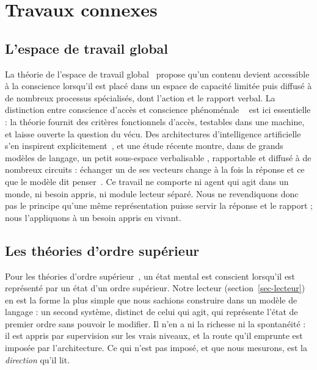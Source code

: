 \documentclass[11pt,a4paper]{article}
\begin{document}
\section{Travaux connexes}
\label{sec-related}

\subsection{L'espace de travail global}

La théorie de l'espace de travail global~\cite{baars1988,dehaene2001,dehaene2011,mashour2020}
propose qu'un contenu devient accessible à la conscience lorsqu'il est placé dans
un espace de capacité limitée puis diffusé à de nombreux processus spécialisés,
dont l'action et le rapport verbal. La distinction entre conscience \og d'accès \fg{}
et conscience \og phénoménale \fg{}~\cite{block1995} est ici essentielle : la
théorie fournit des critères fonctionnels d'accès, testables dans une machine, et
laisse ouverte la question du vécu. Des architectures d'intelligence artificielle
s'en inspirent explicitement~\cite{vanrullen2021,goyal2022}, et une étude
récente montre, dans de grands modèles de langage, un petit sous-espace
\og verbalisable \fg{}, rapportable et diffusé à de nombreux circuits : échanger
un de ses vecteurs change à la fois la réponse et ce que le modèle dit
penser~\cite{workspace2026}. Ce travail ne comporte ni agent qui agit dans un
monde, ni besoin appris, ni module lecteur séparé. Nous ne revendiquons donc pas
le principe qu'une même représentation puisse servir la réponse et le rapport ;
nous l'appliquons à un besoin appris en vivant.

\subsection{Les théories d'ordre supérieur}

Pour les théories d'ordre supérieur~\cite{rosenthal2005,lau2011,brown2019}, un état
mental est conscient lorsqu'il est représenté par un état d'un ordre supérieur.
Notre lecteur (section~\ref{sec-lecteur}) en est la forme la plus simple que nous
sachions construire dans un modèle de langage : un second système, distinct de
celui qui agit, qui représente l'état de premier ordre sans pouvoir le modifier.
Il n'en a ni la richesse ni la spontanéité : il est appris par supervision sur
les vrais niveaux, et la route qu'il emprunte est imposée par l'architecture. Ce
qui n'est pas imposé, et que nous mesurons, est la \emph{direction} qu'il lit.
\end{document}
